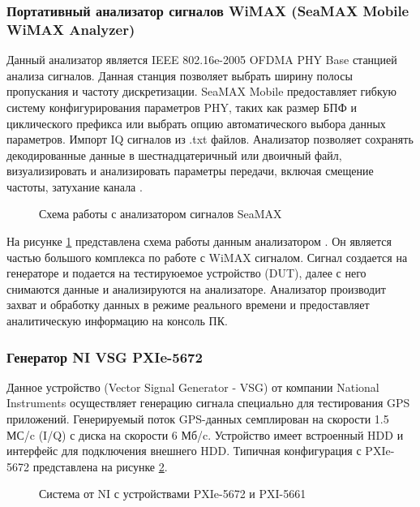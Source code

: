\subsubsection{Портативный анализатор сигналов WiMAX (SeaMAX Mobile WiMAX Analyzer)}
Данный анализатор является IEEE 802.16e-2005 OFDMA PHY Base станцией анализа сигналов. Данная станция 
позволяет выбрать ширину полосы пропускания и частоту дискретизации.
SeaMAX Mobile предоставляет гибкую систему конфигурирования параметров PHY, таких как
размер БПФ и циклического префикса или выбрать опцию автоматического выбора данных параметров. Импорт IQ сигналов
из .txt файлов. Анализатор позволяет сохранять декодированные данные в шестнадцатеричный или двоичный файл,
визуализировать и анализировать параметры передачи, включая смещение частоты, затухание канала
\cite{seamax_overview, seamax_pdf}.

\begin{figure}[H]
\caption{Схема работы с анализатором сигналов SeaMAX}
\label{pic:seamax}
\end{figure}

На рисунке \ref{pic:seamax} представлена схема работы данным анализатором \cite{seamax_pdf}. Он является частью большого комплекса по работе
с WiMAX сигналом. Сигнал создается на генераторе и подается на тестируюемое устройство (DUT), далее с него снимаются 
данные и анализируются на анализаторе. Анализатор производит захват и обработку данных в режиме реального времени и
предоставляет аналитическую информацию на консоль ПК.

\subsubsection{Генератор NI VSG PXIe-5672}
\label{sec:vsg}
Данное устройство (Vector Signal Generator - VSG) от компании National Instruments осуществляет генерацию сигнала специально для тестирования
GPS приложений. Генерируемый поток GPS-данных семплирован на скорости 1.5 МС/c (I/Q) с диска на скорости 6 Мб/c.
Устройство имеет встроенный HDD и интерфейс для подключения внешнего HDD. Типичная конфигурация с PXIe-5672
представлена на рисунке \ref{pic:ni_system}.

\begin{figure}[H]
\begin{center}
\end{center}
\caption{Система от NI с устройствами PXIe-5672 и PXI-5661}
\label{pic:ni_system}
\end{figure}


